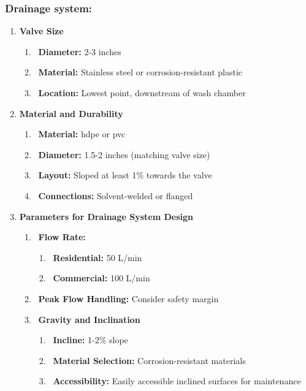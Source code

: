 \documentclass[12pt]{article} %
\begin{document}
\subsubsection{ Drainage system: }
   \begin{enumerate}
   \item \textbf{Valve Size}
   \begin{enumerate}
   \item \ \textbf{Diameter:} 2-3 inches
   \item \ \textbf{Material:} Stainless steel or corrosion-resistant plastic

   \item \ \textbf{Location:} Lowest point, downstream of wash chamber

   


   \end{enumerate}
   \item \textbf{Material and Durability}
   \begin{enumerate}
   \item \ \textbf{Material:} \acrshort{hdpe} or \acrshort{pvc}

   \item \ \textbf{Diameter:} 1.5-2 inches (matching valve size)


   \item \ \textbf{Layout:} Sloped at least 1\% towards the valve
   \item \ \textbf{Connections:} Solvent-welded or flanged
   \end{enumerate}

\item \textbf{Parameters for Drainage System Design}
   \begin{enumerate}
   \item \ \textbf{Flow Rate:}
   \begin{enumerate}
   \item \  \textbf{Residential:} 50 L/min
   \item \ \textbf{Commercial:} 100 L/min
   \end{enumerate}

   \item \ \textbf{Peak Flow Handling: }Consider safety margin



   \item \ \textbf{Gravity and Inclination}
   \begin{enumerate}
   \item \ \textbf{Incline:} 1-2\% slope


   \item \ \textbf{Material Selection:} Corrosion-resistant materials



   \item \ \textbf{Accessibility:} Easily accessible inclined surfaces for maintenance

   \end{enumerate}

\end{enumerate}
\end{enumerate}
\end{document}
